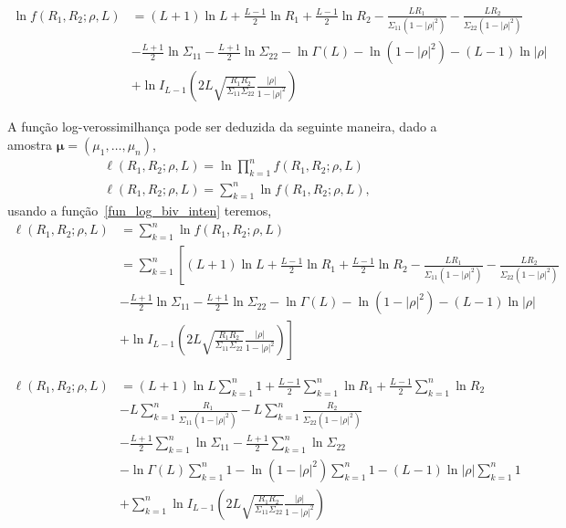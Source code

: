 \begin{equation}\label{fun_log_biv_inten}
\begin{split}
	\ln f(R_1,R_2;\rho,L)&=(L+1)\ln L +\frac{L-1}{2} \ln R_1 +\frac{L-1}{2} \ln R_2 -\frac{LR_1}{\Sigma_{11}(1-|\rho|^2)}-\frac{LR_2}{\Sigma_{22}(1-|\rho|^2)}\\
	&-\frac{L+1}{2}\ln\Sigma_{11}-\frac{L+1}{2}\ln\Sigma_{22} - \ln\Gamma(L)- \ln(1-|\rho|^2)-(L-1)\ln|\rho|\\
	&+\ln I_{L-1}\left(2L\sqrt{\frac{R_1R_2}{\Sigma_{11}\Sigma_{22}}}\frac{|\rho|}{1-|\rho|^2}\right)
\end{split}
\end{equation}


A função log-verossimilhança pode ser deduzida da seguinte maneira, dado a amostra $\bm\mu = (\mu_1,\dots,\mu_n)$, 
\begin{equation}\nonumber
\begin{split}
  \ell(R_1, R_2;\rho, L)=\ln\prod_{k=1}^{n}f(R_1, R_2;\rho,L)\\
  \ell(R_1, R_2;\rho, L)=\sum_{k=1}^{n}\ln f(R_1, R_2;\rho,L),
 \end{split}
 \end{equation}
usando a função~\eqref{fun_log_biv_inten} teremos,
\begin{equation}\nonumber
\begin{split}
    \ell(R_1, R_2;\rho, L)&=\sum_{k=1}^{n}\ln f(R_1, R_2;\rho, L)\\
                         &=\sum_{k=1}^{n}\left[(L+1)\ln L +\frac{L-1}{2} \ln R_1 +\frac{L-1}{2} \ln R_2 -\frac{LR_1}{\Sigma_{11}(1-|\rho|^2)}-\frac{LR_2}{\Sigma_{22}(1-|\rho|^2)}\right.\\
	&-\frac{L+1}{2}\ln\Sigma_{11}-\frac{L+1}{2}\ln\Sigma_{22} - \ln\Gamma(L)- \ln(1-|\rho|^2)-(L-1)\ln|\rho|\\
	&\left.+\ln I_{L-1}\left(2L\sqrt{\frac{R_1R_2}{\Sigma_{11}\Sigma_{22}}}\frac{|\rho|}{1-|\rho|^2}\right)\right]
 \end{split}
 \end{equation}
 
 \begin{equation}\nonumber
\begin{split} 
  \ell(R_1, R_2;\rho, L)&=(L+1)\ln L\sum_{k=1}^{n}1 +\frac{L-1}{2}\sum_{k=1}^{n} \ln R_1 +\frac{L-1}{2} \sum_{k=1}^{n}\ln R_2\\
                        &-L\sum_{k=1}^{n}\frac{R_1}{\Sigma_{11}(1-|\rho|^2)}-L\sum_{k=1}^{n}\frac{R_2}{\Sigma_{22}(1-|\rho|^2)}\\
	&-\frac{L+1}{2}\sum_{k=1}^{n}\ln\Sigma_{11}-\frac{L+1}{2}\sum_{k=1}^{n}\ln\Sigma_{22} \\
	&- \ln\Gamma(L)\sum_{k=1}^{n}1- \ln(1-|\rho|^2)\sum_{k=1}^{n}1-(L-1)\ln|\rho|\sum_{k=1}^{n}1\\
	&+\sum_{k=1}^{n}\ln I_{L-1}\left(2L\sqrt{\frac{R_1R_2}{\Sigma_{11}\Sigma_{22}}}\frac{|\rho|}{1-|\rho|^2}\right)
\end{split}
\end{equation}

